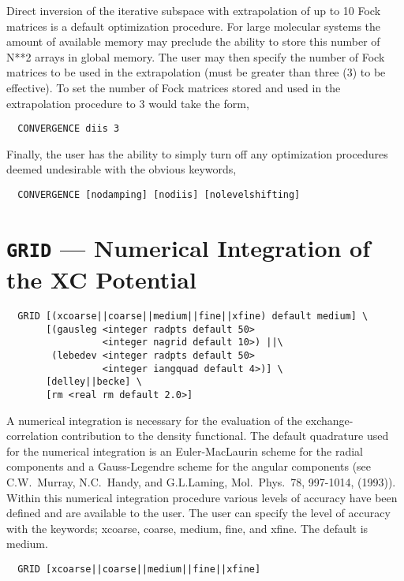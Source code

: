 Direct inversion of the iterative subspace with extrapolation of up to
10 Fock matrices is a default optimization procedure.  For large
molecular systems the amount of available memory may preclude the ability to
store this number of N**2 arrays in global memory.  The user may then
specify the number of Fock matrices to be used in the extrapolation
(must be greater than three (3) to be effective).  To set the number of
Fock matrices stored and used in the extrapolation procedure to 3
would take the form,
\begin{verbatim}
  CONVERGENCE diis 3
\end{verbatim}

Finally, the user has the ability to simply turn off any optimization
procedures deemed undesirable with the obvious keywords,
\begin{verbatim}
  CONVERGENCE [nodamping] [nodiis] [nolevelshifting]
\end{verbatim}


\section{{\tt GRID} --- Numerical Integration of the XC Potential}

\begin{verbatim}
  GRID [(xcoarse||coarse||medium||fine||xfine) default medium] \
       [(gausleg <integer radpts default 50> 
                 <integer nagrid default 10>) ||\ 
        (lebedev <integer radpts default 50> 
                 <integer iangquad default 4>)] \ 
       [delley||becke] \
       [rm <real rm default 2.0>]
\end{verbatim}

A numerical integration is necessary for the evaluation of the
exchange-correlation contribution to the density functional.  The
default quadrature used for the numerical integration is an
Euler-MacLaurin scheme for the radial components and a Gauss-Legendre
scheme for the angular components (see C.W.~Murray, N.C.~Handy, and
G.L.Laming, Mol.~Phys.~78, 997-1014, (1993)).  Within this numerical
integration procedure various levels of accuracy have been defined and
are available to the user.  The user can specify the level of accuracy
with the keywords; xcoarse, coarse, medium, fine, and xfine.  The
default is medium.

\begin{verbatim}
  GRID [xcoarse||coarse||medium||fine||xfine]
\end{verbatim}

